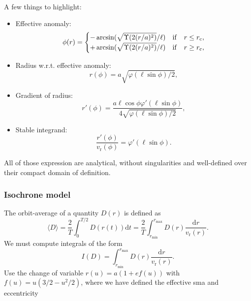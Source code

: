 \documentclass[11pt]{article}
\newcommand{\rr}{\mathrm{r}}
\newcommand{\rc}{\mathrm{c}}
\newcommand{\rd}{{\mathrm{d}}}
\newcommand{\vr}{v_{\rr}}
\newcommand{\rmax}{r_{\max}}
\newcommand{\rmin}{r_{\min}}
\newcommand{\rrc}{r_{\rc}}
\begin{document}
A few things to highlight:
\begin{itemize}
\item Effective anomaly:
  \begin{equation}
  \phi(r)=\begin{cases}
\displaystyle{ -\arcsin(\sqrt{\Upsilon(2(r/a)^{2})}/\ell)} & {\rm{if}} \quad r\leq\rrc ,\\
\displaystyle{ +\arcsin(\sqrt{\Upsilon(2(r/a)^{2})}/\ell)} &{\rm{if}} \quad r\geq\rrc ,
  \end{cases}
  \label{eq:effective_anomaly}
  \end{equation}
  
\item Radius w.r.t. effective anomaly:
  \begin{equation}
 r(\phi)=a \sqrt{\varphi(\ell\sin\phi)/2} ,
  \label{eq:r(effective_anomaly)}
  \end{equation}
  
\item Gradient of radius:
  \begin{equation}
 r'(\phi)=\frac{a\ell\cos\phi\varphi'(\ell\sin\phi)}{4\sqrt{\varphi(\ell\sin\phi)/2}} ,
  \label{eq:Gradient_r(effective_anomaly)}
  \end{equation}
  
\item Stable integrand:
  \begin{equation}
 \frac{r'(\phi)}{\vr(\phi)}=\varphi'(\ell\sin\phi) .
  \label{eq:Gradient_r(effective_anomaly)_over_vr}
  \end{equation}
\end{itemize}

All of those expression are analytical, without singularities and well-defined over their compact domain of definition.

\subsubsection{Isochrone model}
\label{subsubsec:IsochroneOrbitStudy}

The orbit-average of a quantity $D(r)$ is defined as
$$\langle D\rangle = \frac{2}{T} \int_{0}^{T/2} D(r(t)) \rd t = \frac{2}{T} \int_{\rmin}^{\rmax} D(r) \frac{\rd r}{\vr(r)} .$$
We must compute integrals of the form
$$I(D) = \int_{\rmin}^{\rmax} D(r) \frac{\rd r}{\vr(r)} .$$
Use the change of variable $r(u)=a(1+ef(u))$ with $f(u)=u(3/2-u^{2}/2)$, where we have defined the effective sma and eccentricity
\end{document}
